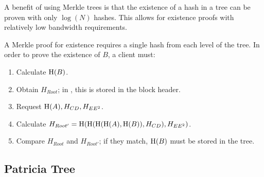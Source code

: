 \begin{figure}
\end{figure}

A benefit of using Merkle trees is that the existence of a hash in a tree can be proven with only $\log(N)$ hashes.
This allows for existence proofs with relatively low bandwidth requirements.

A Merkle proof for existence requires a single hash from each level of the tree.
In order to prove the existence of $B$, a client must:
\begin{enumerate}
	\item{Calculate $\operatorname{H}(B)$.}
	\item{Obtain $H_{Root}$; in \codename, this is stored in the block header.}
	\item{Request $\operatorname{H}(A), H_{CD}, H_{EE^2}$.}
	\item{Calculate $H_{Root'} = \operatorname{H}(\operatorname{H}(\operatorname{H}(\operatorname{H}(A), \operatorname{H}(B)), H_{CD}), H_{EE^2})$.}
	\item{Compare $H_{Root}$ and $H_{Root'}$; if they match, $\operatorname{H}(B)$ must be stored in the tree.}
\end{enumerate}

\subsection{Patricia Tree}
\label{sec:trees:patricia}

